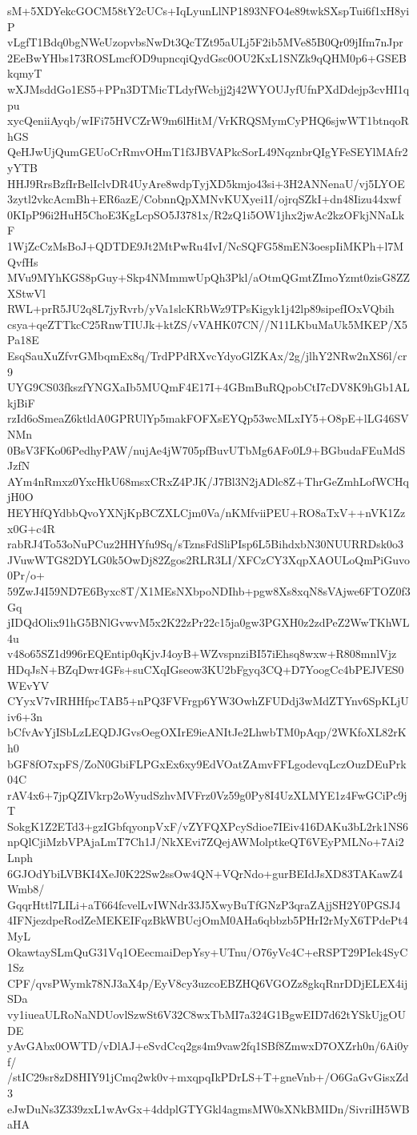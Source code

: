 sM+5XDYekcGOCM58tY2cUCs+IqLyunLlNP1893NFO4e89twkSXspTui6f1xH8yiP
vLgfT1Bdq0bgNWeUzopvbsNwDt3QcTZt95aULj5F2ib5MVe85B0Qr09jIfm7nJpr
2EeBwYHbs173ROSLmcfOD9upncqiQydGsc0OU2KxL1SNZk9qQHM0p6+GSEBkqmyT
wXJMsddGo1ES5+PPn3DTMicTLdyfWcbjj2j42WYOUJyfUfnPXdDdejp3cvHI1qpu
xycQeniiAyqb/wIFi75HVCZrW9m6lHitM/VrKRQSMymCyPHQ6sjwWT1btnqoRhGS
QeHJwUjQumGEUoCrRmvOHmT1f3JBVAPkcSorL49NqznbrQIgYFeSEYlMAfr2yYTB
HHJ9RrsBzfIrBelIclvDR4UyAre8wdpTyjXD5kmjo43si+3H2ANNenaU/vj5LYOE
3zytl2vkcAcmBh+ER6azE/CobnnQpXMNvKUXyei1I/ojrqSZkI+dn48Iizu44xwf
0KIpP96i2HuH5ChoE3KgLcpSO5J3781x/R2zQ1i5OW1jhx2jwAc2kzOFkjNNaLkF
1WjZcCzMsBoJ+QDTDE9Jt2MtPwRu4IvI/NcSQFG58mEN3oespIiMKPh+l7MQvfHs
MVu9MYhKGS8pGuy+Skp4NMmmwUpQh3Pkl/aOtmQGmtZImoYzmt0zisG8ZZXStwVl
RWL+prR5JU2q8L7jyRvrb/yVa1slcKRbWz9TPsKigyk1j42lp89sipefIOxVQbih
csya+qeZTTkcC25RnwTIUJk+ktZS/vVAHK07CN//N11LKbuMaUk5MKEP/X5Pa18E
EsqSauXuZfvrGMbqmEx8q/TrdPPdRXvcYdyoGlZKAx/2g/jlhY2NRw2nXS6l/cr9
UYG9CS03fkszfYNGXaIb5MUQmF4E17I+4GBmBuRQpobCtI7cDV8K9hGb1ALkjBiF
rzId6oSmeaZ6ktldA0GPRUlYp5makFOFXsEYQp53wcMLxIY5+O8pE+lLG46SVNMn
0BsV3FKo06PedhyPAW/nujAe4jW705pfBuvUTbMg6AFo0L9+BGbudaFEuMdSJzfN
AYm4nRmxz0YxcHkU68msxCRxZ4PJK/J7Bl3N2jADlc8Z+ThrGeZmhLofWCHqjH0O
HEYHfQYdbbQvoYXNjKpBCZXLCjm0Va/nKMfviiPEU+RO8aTxV++nVK1Zzx0G+c4R
rabRJ4To53oNuPCuz2HHYfu9Sq/sTznsFdSliPIsp6L5BihdxbN30NUURRDsk0o3
JVuwWTG82DYLG0k5OwDj82Zgos2RLR3LI/XFCzCY3XqpXAOULoQmPiGuvo0Pr/o+
59ZwJ4I59ND7E6Byxc8T/X1MEsNXbpoNDIhb+pgw8Xs8xqN8sVAjwe6FTOZ0f3Gq
jIDQdOlix91hG5BNlGvwvM5x2K22zPr22c15ja0gw3PGXH0z2zdPeZ2WwTKhWL4u
v48o65SZ1d996rEQEntip0qKjvJ4oyB+WZvspnziBI57iEhsq8wxw+R808mnlVjz
HDqJsN+BZqDwr4GFs+suCXqIGseow3KU2bFgyq3CQ+D7YoogCc4bPEJVES0WEvYV
CYyxV7vIRHHfpcTAB5+nPQ3FVFrgp6YW3OwhZFUDdj3wMdZTYnv6SpKLjUiv6+3n
bCfvAvYjISbLzLEQDJGvsOegOXIrE9ieANItJe2LhwbTM0pAqp/2WKfoXL82rKh0
bGF8fO7xpFS/ZoN0GbiFLPGxEx6xy9EdVOatZAmvFFLgodevqLczOuzDEuPrk04C
rAV4x6+7jpQZIVkrp2oWyudSzhvMVFrz0Vz59g0Py8I4UzXLMYE1z4FwGCiPc9jT
SokgK1Z2ETd3+gzIGbfqyonpVxF/vZYFQXPcySdioe7IEiv416DAKu3bL2rk1NS6
npQlCjiMzbVPAjaLmT7Ch1J/NkXEvi7ZQejAWMolptkeQT6VEyPMLNo+7Ai2Lnph
6GJOdYbiLVBKI4XeJ0K22Sw2ssOw4QN+VQrNdo+gurBEIdJsXD83TAKawZ4Wmb8/
GqqrHttl7LILi+aT664fcvelLvIWNdr33J5XwyBuTfGNzP3qraZAjjSH2Y0PGSJ4
4IFNjezdpeRodZeMEKEIFqzBkWBUcjOmM0AHa6qbbzb5PHrI2rMyX6TPdePt4MyL
OkawtaySLmQuG31Vq1OEecmaiDepYsy+UTnu/O76yVc4C+eRSPT29PIek4SyC1Sz
CPF/qvsPWymk78NJ3aX4p/EyV8cy3uzcoEBZHQ6VGOZz8gkqRnrDDjELEX4ijSDa
vy1iueaULRoNaNDUovlSzwSt6V32C8wxTbMI7a324G1BgwEID7d62tYSkUjgOUDE
yAvGAbx0OWTD/vDlAJ+eSvdCcq2gs4m9vaw2fq1SBf8ZmwxD7OXZrh0n/6Ai0yf/
/stIC29sr8zD8HIY91jCmq2wk0v+mxqpqIkPDrLS+T+gneVnb+/O6GaGvGisxZd3
eJwDuNs3Z339zxL1wAvGx+4ddplGTYGkl4agmsMW0sXNkBMIDn/SivriIH5WBaHA
